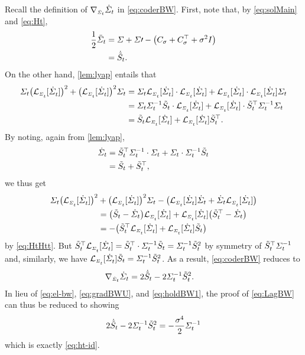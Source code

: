 Recall the definition of $\nabla_{\scriptscriptstyle\dot{\Sigma}_{t}}\dot{\Sigma}_{t}$ in \eqref{eq:coderBW}. First, note that, by \eqref{eq:solMain} and \eqref{eq:Ht},
\begin{align}
\label{eq:ddot}
\frac{1}{2}\ddSigcurve &=   \Sigma+\Sigma\prime -  \parens*{  \C + \C^\top+ \sdev^2\eye }   \\
&=  \dHt.
\end{align}
On the other hand, \cref{lem:lyap} entails that
\begin{align}
\nn
\Sigcurve \parens*{\lyap}^2 + \parens*{\lyap}^2 \Sigcurve &= \Sigcurve \lyap \cdot \lyap + \lyap \cdot \lyap\Sigcurve \\
\nn
 &= \Sigcurve \Sigcurveinv \Ht \cdot \lyap + \lyap \cdot \Ht^\top \Sigcurveinv \Sigcurve \\
 \label{eq:holdBW}
 &= \Ht \lyap + \lyap \Ht^\top.
\end{align}
By noting, again from \cref{lem:lyap},
\begin{align}
\nn
\dSigcurve &= \Ht^\top \Sigcurveinv \cdot \Sigcurve + \Sigcurve \cdot \Sigcurveinv\Ht \\
\label{eq:HtHtt}
&= \Ht + \Ht^\top,
\end{align}
we thus get
\begin{align}\nn
 \Sigcurve \parens*{\lyap}^2 &+ \parens*{\lyap}^2 \Sigcurve- \parens*{  \lyap \dSigcurve + \dSigcurve\lyap } \\
 &= \parens*{\Ht - \dSigcurve} \lyap + \lyap \parens*{\Ht^\top - \dSigcurve} \\
 \nn
 &= - \parens*{ \Ht^\top\lyap + \lyap \Ht  }
\end{align}by \eqref{eq:HtHtt}. But $\Ht^\top\lyap  = \Ht^\top \cdot \Sigcurveinv \Ht =\Sigcurveinv \Ht^2$ by symmetry of $\tilde{S}_{t}^\top \Sigma^{-1}_{t}$ and, similarly, we have $\lyap\Ht =  \Sigcurveinv \Ht^2$. As a result, \eqref{eq:coderBW} reduces to
\begin{align}
\label{eq:holdBW1}
\coder &= 2\dHt - 2 \Sigcurveinv\Ht^2.
\end{align}In lieu of \eqref{eq:el-bw}, \eqref{eq:gradBWU}, and \eqref{eq:holdBW1}, the proof of \eqref{eq:LagBW} can thus be reduced to showing
\begin{align}
2\dot{\tilde{S}}_{t} -  2\Sigma^{-1}_{t}\tilde{S}_{t}^2 = -\frac{\sigma^4}{2} \Sigma^{-1}_{t}
\end{align}which is exactly \eqref{eq:ht-id}.



